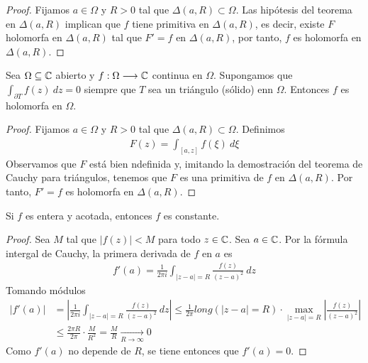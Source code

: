 \begin{proof}
    Fijamos $a \in \Omega$ y $R > 0$ tal que $\Delta(a,R) \subset \Omega$. Las hipótesis del teorema en $\Delta(a,R)$ implican que $f$ tiene primitiva en $\Delta(a,R)$, es decir, existe $F$ holomorfa en $\Delta(a,R)$ tal que $F' = f$ en $\Delta(a,R)$, por tanto, $f$ es holomorfa en $\Delta(a,R)$.
\end{proof}

\begin{teo}
    Sea $\Omega \subseteq \mathbb{C}$ abierto y $f: \Omega \longrightarrow \mathbb{C}$ continua en $\Omega$. Supongamos que $\int_{\partial T}{f(z) \ dz} = 0$ siempre que $T$ sea un triángulo (sólido) enn $\Omega$. Entonces $f$ es holomorfa en $\Omega$.
\end{teo}

\begin{proof}
    Fijamos $a \in \Omega$ y $R > 0$ tal que $\Delta(a,R) \subset \Omega$. Definimos
    \begin{align*}
        F(z) = \int_{[a,z]}{f(\xi) \ d\xi}
    \end{align*}
    Observamos que $F$ está bien ndefinida y, imitando la demostración del teorema de Cauchy para triángulos, tenemos que $F$ es una primitiva de $f$ en $\Delta(a,R)$. Por tanto, $F' = f$ es holomorfa en $\Delta(a,R)$.
\end{proof}

\begin{teo}[de Liouville]
    Si $f$ es entera y acotada, entonces $f$ es constante.
\end{teo}

\begin{proof}
    Sea $M$ tal que $|f(z)| < M$ para todo $z \in \mathbb{C}$. Sea $a \in \mathbb{C}$. Por la fórmula intergal de Cauchy, la primera derivada de $f$ en $a$ es
    \begin{align*}
        f'(a) = \frac{1}{2\pi i}\int_{|z-a| = R}{\frac{f(z)}{(z-a)^2} \ dz}
    \end{align*}
    Tomando módulos
    \begin{align*}
        |f'(a)| & = \left| \frac{1}{2\pi i}\int_{|z-a| = R}{\frac{f(z)}{(z-a)^2} \ dz} \right|  \leq \frac{1}{2\pi} long(|z-a| = R) \cdot \max_{|z-a| = R} \left| \frac{f(z)}{(z-a)^2} \right| \\
                & \leq \frac{2\pi R}{2\pi} \cdot \frac{M}{R^2} = \frac{M}{R} \xrightarrow[R \to \infty]{} 0
    \end{align*}
    Como $f'(a)$ no depende de $R$, se tiene entonces que $f'(a) = 0$.
\end{proof}

